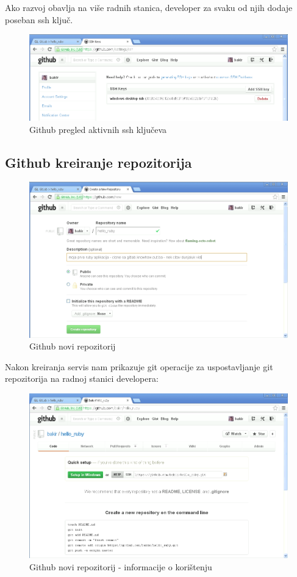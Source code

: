 \documentclass[times, utf8, seminar]{fit}
\begin{document}
Ako razvoj obavlja na više radnih stanica, developer za svaku od njih dodaje poseban ssh ključ.

\begin{figure}[H]
\centering
\includegraphics[width=15cm]{img/github_ssh_profile_2.png}
\caption{Github pregled aktivnih ssh ključeva}
\end{figure}

\subsection{Github kreiranje repozitorija}

\begin{figure}[H]
\centering
\includegraphics[width=15cm]{img/github_new_repos.png}
\caption{Github novi repozitorij}
\end{figure}

Nakon kreiranja servis nam prikazuje git operacije za uspostavljanje git repozitorija na radnoj stanici developera:

\begin{figure}[H]
\centering
\includegraphics[width=15cm]{img/github_new_repos_2.png}
\caption{Github novi repozitorij - informacije o korištenju}
\end{figure}
\end{document}
